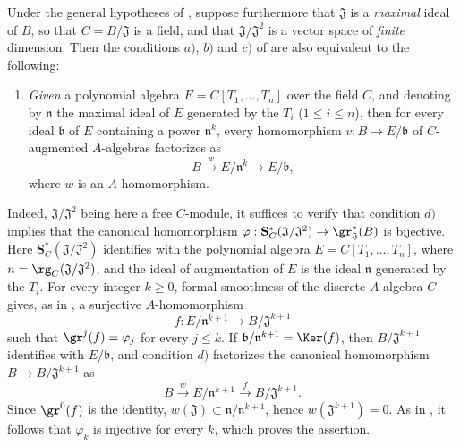 \begin{remark}[19.5.5]
\label{0.19.5.5}
Under the general hypotheses of , suppose furthermore that $\mathfrak{J}$ is a \emph{maximal} ideal of $B$, so that $C=B/\mathfrak{J}$ is a field, and that $\mathfrak{J}/\mathfrak{J}^2$ is a vector space of \emph{finite} dimension.
Then the conditions $a)$, $b)$ and $c)$ of  are also equivalent to the following:
\begin{enumerate}
  \item[d)] \emph{Given} a polynomial algebra $E=C[T_1,\ldots,T_n]$ over the field $C$, and denoting by $\mathfrak{n}$ the maximal ideal of $E$ generated by the $T_i$ ($1\leq i\leq n$), then for every ideal $\mathfrak{b}$ of $E$ containing a power $\mathfrak{n}^k$, every homomorphism $v:B\to E/\mathfrak{b}$ of $C$-augmented $A$-algebras factorizes as
  \[
    B\xrightarrow{w}E/\mathfrak{n}^k\to E/\mathfrak{b},
  \]
  where $w$ is an $A$-homomorphism.
\end{enumerate}
Indeed, $\mathfrak{J}/\mathfrak{J}^2$ being here a free $C$-module, it suffices to verify that condition $d)$ implies that the canonical homomorphism
$\varphi:\mathbf{S}_C^*(\mathfrak{J}/\mathfrak{J}^2)\to\gr_\mathfrak{J}^*(B)$
is bijective.
Here $\mathbf{S}_C^*(\mathfrak{J}/\mathfrak{J}^2)$ identifies with the polynomial algebra $E=C[T_1,\ldots,T_n]$, where $n=\rg_C(\mathfrak{J}/\mathfrak{J}^2)$, and the ideal of augmentation of $E$ is the ideal $\mathfrak{n}$ generated by the $T_i$.
For every integer $k\geq 0$, formal smoothness of the discrete $A$-algebra $C$ gives, as in , a surjective $A$-homomorphism
\[
  f:E/\mathfrak{n}^{k+1}\to B/\mathfrak{J}^{k+1}
\]
such that $\gr^j(f)=\varphi_j$ for every $j\leq k$.
If $\mathfrak{b}/\mathfrak{n}^{k+1}=\Ker(f)$, then $B/\mathfrak{J}^{k+1}$ identifies with $E/\mathfrak{b}$, and condition $d)$ factorizes the canonical homomorphism $B\to B/\mathfrak{J}^{k+1}$ as
\[
  B\xrightarrow{w}E/\mathfrak{n}^{k+1}
  \xrightarrow{f}B/\mathfrak{J}^{k+1}.
\]
Since $\gr^0(f)$ is the identity, $w(\mathfrak{J})\subset\mathfrak{n}/\mathfrak{n}^{k+1}$, hence $w(\mathfrak{J}^{k+1})=0$.
As in , it follows that $\varphi_k$ is injective for every $k$, which proves the assertion.
\end{remark}

